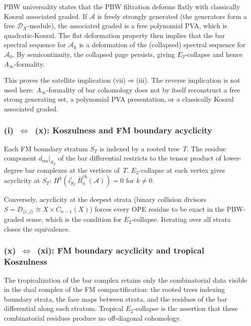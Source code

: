 \documentclass[11pt,reqno]{amsart}
\theoremstyle{definition}
\theoremstyle{remark}
\newcommand{\cA}{\mathcal{A}}
\newcommand{\cD}{\mathcal{D}}
\newcommand{\barBch}{\bar{B}^{\mathrm{ch}}}
\newcommand{\FM}{\overline{C}}
\newcommand{\Etwo}{E_2}
\newcommand{\Ainfty}{A_\infty}
\numberwithin{equation}{section}
\begin{document}
PBW universality states that the PBW filtration deforms flatly
with classically Koszul associated graded. If $\cA$ is freely
strongly generated (the generators form a free $\cD_X$-module),
the associated graded is a free polynomial PVA, which is
quadratic-Koszul. The flat deformation property then implies that
the bar spectral sequence for $\cA_\hbar$ is a deformation of
the (collapsed) spectral sequence for $\cA_0$. By
semicontinuity, the collapsed page persists, giving
$\Etwo$-collapse and hence $\Ainfty$-formality.

This proves the satellite implication
\textup{(vii)}$\Rightarrow$\textup{(iii)}. The reverse implication
is not used here: $\Ainfty$-formality of bar cohomology does not
by itself reconstruct a free strong generating set, a polynomial
PVA presentation, or a classically Koszul associated graded.

\subsubsection*{\textup{(i)}~$\Leftrightarrow$~\textup{(x):}
Koszulness and FM boundary acyclicity}

Each FM boundary stratum $S_T$ is indexed by a rooted tree~$T$.
The residue component $d_{\mathrm{res}}|_{S_T}$ of the bar
differential restricts to the tensor product of lower-degree bar
complexes at the vertices of~$T$. $\Etwo$-collapse at each
vertex gives acyclicity at $S_T$:
$H^k(i_{S_T}^!\,\barBch_n(\cA)) = 0$ for $k \neq 0$.

Conversely, acyclicity at the deepest strata (binary collision
divisors $S = D_{\{i,j\}} \cong X \times \FM_{n-1}(X)$) forces
every OPE residue to be exact in the PBW-graded sense, which is
the condition for $\Etwo$-collapse. Iterating over all strata
closes the equivalence.

\subsubsection*{\textup{(x)}~$\Leftrightarrow$~\textup{(xi):}
FM boundary acyclicity and tropical Koszulness}

The tropicalization of the bar complex retains only the
combinatorial data visible in the dual complex of the FM
compactification: the rooted trees indexing boundary strata, the
face maps between strata, and the residues of the bar differential
along each stratum. Tropical $\Etwo$-collapse is the assertion
that these combinatorial residues produce no off-diagonal cohomology.
\end{document}
